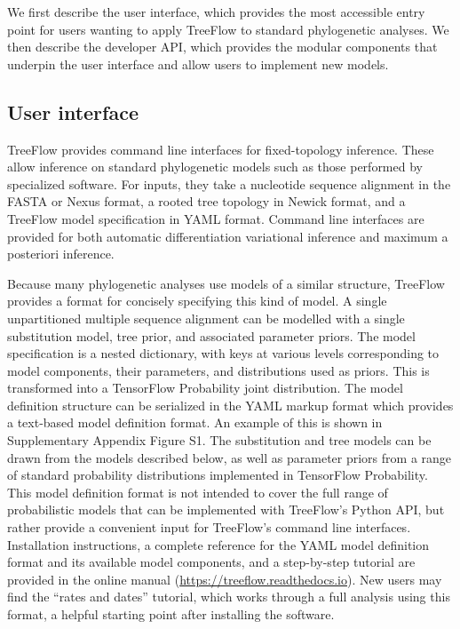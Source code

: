\documentclass[oupdraft]{sysbio_sse}
\begin{document}
\newlength{\originalbaselineskip}
\setlength{\originalbaselineskip}{\baselineskip}


\setlength{\baselineskip}{\originalbaselineskip}

We first describe the user interface, which provides the most accessible entry point for users wanting to apply TreeFlow to standard phylogenetic analyses. We then describe the developer API, which provides the modular components that underpin the user interface and allow users to implement new models.

\subsection{User interface}

TreeFlow provides command line interfaces for fixed-topology inference. These allow inference on standard phylogenetic models such as those performed by specialized software. For inputs, they take a nucleotide sequence alignment in the FASTA or Nexus format, a rooted tree topology in Newick format, and a TreeFlow model specification in YAML format. Command line interfaces are provided for both automatic differentiation variational inference and maximum a posteriori inference.

Because many phylogenetic analyses use models of a similar structure, TreeFlow provides a format for concisely specifying this kind of model. A single unpartitioned multiple sequence alignment can be modelled with a single substitution model, tree prior, and associated parameter priors. The model specification is a nested dictionary, with keys at various levels corresponding to model components, their parameters, and distributions used as priors. This is transformed into a TensorFlow Probability joint distribution. The model definition structure can be serialized in the YAML markup format which provides a text-based model definition format. An example of this is shown in Supplementary Appendix Figure S1. The substitution and tree models can be drawn from the models described below, as well as parameter priors from a range of standard probability distributions implemented in TensorFlow Probability. This model definition format is not intended to cover the full range of probabilistic models that can be implemented with TreeFlow's Python API, but rather provide a convenient input for TreeFlow's command line interfaces. Installation instructions, a complete reference for the YAML model definition format and its available model components, and a step-by-step tutorial are provided in the online manual (\url{https://treeflow.readthedocs.io}). New users may find the ``rates and dates'' tutorial, which works through a full analysis using this format, a helpful starting point after installing the software.
\end{document}
